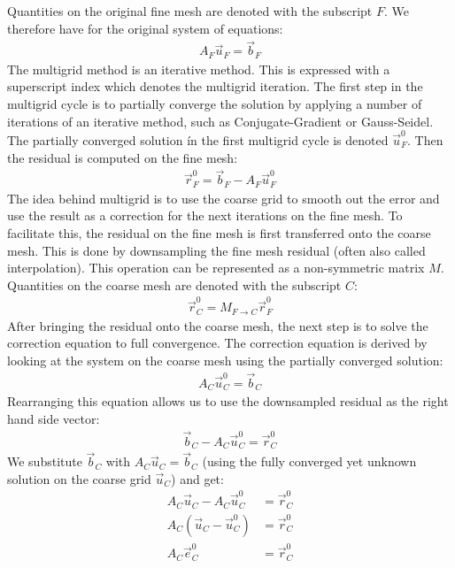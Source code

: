 Quantities on the original fine mesh are denoted with the subscript $F$. We therefore have for the original system of equations:
\begin{align}
\nonumber
A_F\vec{u}_F = \vec{b}_F
\end{align}
The multigrid method is an iterative method. This is expressed with a superscript index which denotes the multigrid iteration. The first step in the multigrid cycle is to partially converge the solution by applying a number of iterations of an iterative method, such as Conjugate-Gradient or Gauss-Seidel. The partially converged solution ín the first multigrid cycle is denoted $\vec{u}_F^0$. Then the residual is computed on the fine mesh:
\begin{align}
\nonumber
\vec{r}_F^0 = \vec{b}_F-A_F\vec{u}_F^0
\end{align}
The idea behind multigrid is to use the coarse grid to smooth out the error and use the result as a correction for the next iterations on the fine mesh. To facilitate this, the residual on the fine mesh is first transferred onto the coarse mesh. This is done by downsampling the fine mesh residual (often also called interpolation). This operation can be represented as a non-symmetric matrix $M$. Quantities on the coarse mesh are denoted with the subscript $C$:
\begin{align}
\nonumber
\vec{r}_C^0 = M_{F\rightarrow C} \vec{r}_F^0
\end{align}
After bringing the residual onto the coarse mesh, the next step is to solve the correction equation to full convergence. The correction equation is derived by looking at the system on the coarse mesh using the partially converged solution:
\begin{align}
\nonumber
A_C\vec{u}_C^0 = \vec{b}_C
\end{align}
Rearranging this equation allows us to use the downsampled residual as the right hand side vector:
\begin{align}
\nonumber
\vec{b}_C - A_C\vec{u}_C^0 = \vec{r}_C^0
\end{align}
We substitute $\vec{b}_C$ with $A_C\vec{u}_C=\vec{b}_C$ (using the fully converged yet unknown solution on the coarse grid $\vec{u}_C$) and get:
\begin{align}
A_C\vec{u}_C - A_C\vec{u}_C^0 &= \vec{r}_C^0
\nonumber
\\
A_C\left(\vec{u}_C-\vec{u}_C^0\right) &= \vec{r}_C^0
\nonumber
\\
A_C\vec{e}_C^0 &= \vec{r}_C^0
\label{eq:da_correction_equation}
\end{align}
